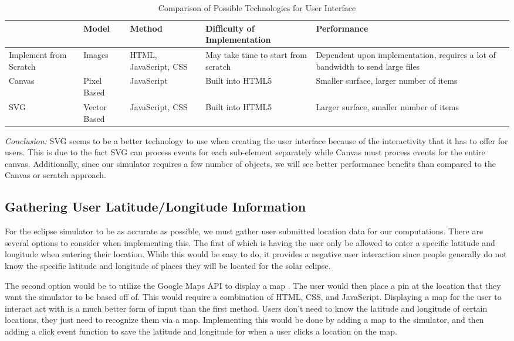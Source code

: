 \documentclass[10pt, onecolumn, draftclsnofoot, letterpaper, compsoc]{IEEEtran}
\begin{document}
\begin{table}[h]
\centering
\caption{Comparison of Possible Technologies for User Interface}
\begin{tabular}{|p{3.15cm}|p{3.15cm}|p{3.15cm}|p{3.15cm}|p{3.15cm}|}
\cline{5-4}

\hline  & Model & Method & Difficulty of Implementation & Performance\\ \hline

Implement from Scratch & Images & HTML, JavaScript, CSS & May take time to
start from scratch & Dependent upon implementation, requires a lot of
bandwidth to send large files \\ \hline

Canvas & Pixel Based & JavaScript & Built into HTML5 & Smaller surface,
larger number of items \\ \hline

SVG & Vector Based & JavaScript, CSS & Built into HTML5 & Larger surface,
smaller number of items \\ \hline

\end{tabular}
\label{table:Jake1}
\end{table}

\textit{Conclusion:} SVG seems to be a better technology to use when creating
the user interface because of the interactivity that it has to offer for users.
This is due to the fact SVG can process events for each sub-element separately
while Canvas must process events for the entire canvas. Additionally, since
our simulator requires a few number of objects, we will see better performance
benefits than compared to the Canvas or scratch approach.

\subsection{Gathering User Latitude/Longitude Information}

For the eclipse simulator to be as accurate as possible, we must gather user
submitted location data for our computations. There are several options to
consider when implementing this. The first of which is having the user only be
allowed to enter a specific latitude and longitude when entering their
location. While this would be easy to do, it provides a negative user
interaction since people generally do not know the specific latitude and
longitude of places they will be located for the solar eclipse.

The second option would be to utilize the Google Maps API to display a map
\cite{jsAPI}.
The user would then place a pin at the location that they want the simulator
to be based off of. This would require a combination of HTML, CSS, and
JavaScript. Displaying a map for the user to interact act with is a much
better form of input than the first method. Users don’t need to know the
latitude and longitude of certain locations, they just need to recognize
them via a map. Implementing this would be done by adding a map to the
simulator, and then adding a click event function to save the latitude and
longitude for when a user clicks a location on the map.
\end{document}
